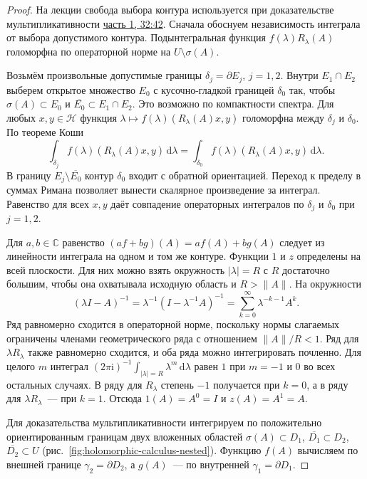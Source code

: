 \documentclass[11pt,a4paper]{article}
\theoremstyle{plain}
\theoremstyle{definition}
\newcommand{\CC}{\mathbb C}
\newcommand{\Hh}{\mathcal H}
\newcommand{\id}{I}
\newcommand{\dd}{\,\mathrm d}
\newcommand{\ii}{\mathrm i}
\newcommand{\norm}[1]{\lVert#1\rVert}
\newcommand{\at}[3]{\href{https://www.youtube.com/watch?v=#1&t=#2s}{#3}}
\begin{document}
\begin{proof}
На лекции свобода выбора контура используется при
доказательстве мультипликативности
\at{gP2CCEuVufo}{1962}{часть 1, 32:42}. Сначала обоснуем
независимость интеграла от выбора допустимого контура.
Подынтегральная функция $f(\lambda)R_\lambda(A)$
голоморфна по операторной норме на $U\setminus\sigma(A)$.

Возьмём произвольные допустимые границы $\delta_j=\partial E_j$, $j=1,2$.
Внутри $E_1\cap E_2$ выберем открытое множество $E_0$
с кусочно-гладкой границей $\delta_0$ так, чтобы
$\sigma(A)\subset E_0$ и $\overline{E_0}\subset E_1\cap E_2$.
Это возможно по компактности спектра. Для любых $x,y\in\Hh$
функция $\lambda\mapsto f(\lambda)(R_\lambda(A)x,y)$
голоморфна между $\delta_j$ и $\delta_0$.
По теореме Коши
\[
 \int_{\delta_j}f(\lambda)(R_\lambda(A)x,y)\dd\lambda
 =
 \int_{\delta_0}f(\lambda)(R_\lambda(A)x,y)\dd\lambda .
\]
В границу $E_j\setminus\overline{E_0}$ контур $\delta_0$
входит с обратной ориентацией. Переход к пределу в суммах
Римана позволяет вынести скалярное произведение за интеграл.
Равенство для всех $x,y$ даёт совпадение операторных
интегралов по $\delta_j$ и $\delta_0$ при $j=1,2$.

Для $a,b\in\CC$ равенство
$(af+bg)(A)=af(A)+bg(A)$ следует из линейности интеграла
на одном и том же контуре. Функции $1$ и $z$ определены
на всей плоскости. Для них можно взять окружность
$|\lambda|=R$ с $R$ достаточно большим, чтобы она
охватывала исходную область и $R>\norm A$. На окружности
\[
 (\lambda\id-A)^{-1}
 =\lambda^{-1}(\id-\lambda^{-1}A)^{-1}
 =\sum_{k=0}^\infty \lambda^{-k-1}A^k .
\]
Ряд равномерно сходится в операторной норме, поскольку
нормы слагаемых ограничены членами геометрического ряда
с отношением $\norm A/R<1$. Ряд для $\lambda R_\lambda$
также равномерно сходится, и оба ряда можно интегрировать
почленно. Для целого $m$ интеграл
$(2\pi\ii)^{-1}\int_{|\lambda|=R}\lambda^m\dd\lambda$
равен $1$ при $m=-1$ и $0$ во всех остальных случаях.
В ряду для $R_\lambda$ степень $-1$ получается при $k=0$,
а в ряду для $\lambda R_\lambda$~--- при $k=1$. Отсюда
$1(A)=A^0=\id$ и $z(A)=A^1=A$.

Для доказательства мультипликативности интегрируем
по положительно ориентированным границам двух вложенных
областей $\sigma(A)\subset D_1$, $\overline{D_1}\subset D_2$,
$\overline{D_2}\subset U$ (рис.~\ref{fig:holomorphic-calculus-nested}).
Функцию $f(A)$ вычисляем по внешней границе
$\gamma_2=\partial D_2$, а $g(A)$~--- по внутренней
$\gamma_1=\partial D_1$.


\end{proof}
\end{document}
